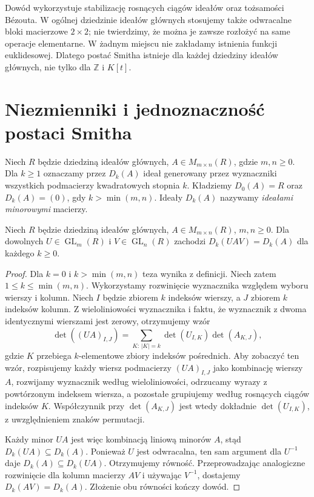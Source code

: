 \begin{uwaga}
Dowód wykorzystuje stabilizację rosnących ciągów ideałów
oraz tożsamości Bézouta. W ogólnej dziedzinie ideałów
głównych stosujemy także odwracalne bloki macierzowe
$2\times2$; nie twierdzimy, że można je zawsze rozłożyć
na same operacje elementarne. W żadnym miejscu nie zakładamy
istnienia funkcji euklidesowej. Dlatego postać Smitha istnieje dla
każdej dziedziny ideałów głównych, nie tylko dla $\mathbb Z$
i $K[t]$.
\end{uwaga}

\section{Niezmienniki i jednoznaczność postaci Smitha}
\begin{definicja}
\label{aa:def:determinantal-ideals}
Niech $R$ będzie dziedziną ideałów głównych,
$A\in M_{m\times n}(R)$, gdzie $m,n\ge0$.
Dla $k\ge1$ oznaczamy przez $D_k(A)$ ideał
generowany przez wyznaczniki wszystkich podmacierzy kwadratowych
stopnia $k$. Kładziemy $D_0(A)=R$ oraz $D_k(A)=(0)$,
gdy $k>\min(m,n)$. Ideały $D_k(A)$ nazywamy
\emph{ideałami minorowymi} macierzy.
\end{definicja}
\begin{lemat}
\label{aa:lem:minor-invariant}
Niech $R$ będzie dziedziną ideałów głównych,
$A\in M_{m\times n}(R)$, $m,n\ge0$.
Dla dowolnych $U\in\operatorname{GL}_m(R)$ i
$V\in\operatorname{GL}_n(R)$ zachodzi $D_k(UAV)=D_k(A)$
dla każdego $k\ge0$.
\end{lemat}
\begin{proof}
Dla $k=0$ i $k>\min(m,n)$ teza wynika z definicji.
Niech zatem $1\le k\le\min(m,n)$. Wykorzystamy
rozwinięcie wyznacznika względem wyboru wierszy i kolumn.
Niech $I$ będzie zbiorem $k$ indeksów wierszy,
a $J$ zbiorem $k$ indeksów kolumn. Z wieloliniowości
wyznacznika i faktu, że wyznacznik z dwoma identycznymi
wierszami jest zerowy, otrzymujemy wzór
\[
 \det((UA)_{I,J})=
 \sum_{K:\,|K|=k}\det(U_{I,K})\det(A_{K,J}),
\]
gdzie $K$ przebiega $k$-elementowe zbiory indeksów
pośrednich. Aby zobaczyć ten wzór, rozpisujemy każdy wiersz
podmacierzy $(UA)_{I,J}$ jako kombinację wierszy $A$,
rozwijamy wyznacznik według wieloliniowości, odrzucamy
wyrazy z powtórzonym indeksem wiersza, a pozostałe
grupiujemy według rosnących ciągów indeksów $K$.
Współczynnik przy $\det(A_{K,J})$ jest wtedy dokładnie
$\det(U_{I,K})$, z uwzględnieniem znaków permutacji.

Każdy minor $UA$ jest więc kombinacją liniową minorów $A$,
stąd $D_k(UA)\subseteq D_k(A)$. Ponieważ $U$ jest
odwracalna, ten sam argument dla $U^{-1}$ daje
$D_k(A)\subseteq D_k(UA)$. Otrzymujemy równość.
Przeprowadzając analogiczne rozwinięcie dla kolumn
macierzy $AV$ i używając $V^{-1}$, dostajemy
$D_k(AV)=D_k(A)$. Złożenie obu równości kończy dowód.

\end{proof}

